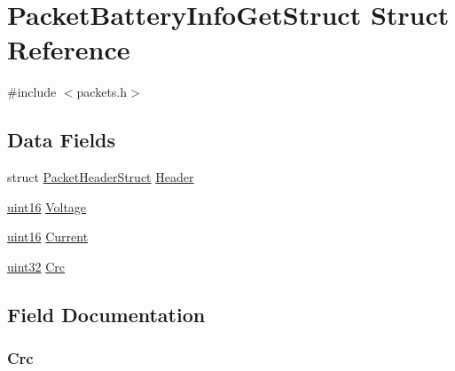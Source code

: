\hypertarget{struct_packet_battery_info_get_struct}{}\section{Packet\+Battery\+Info\+Get\+Struct Struct Reference}
\label{struct_packet_battery_info_get_struct}


{\ttfamily \#include $<$packets.\+h$>$}

\subsection*{Data Fields}
\begin{DoxyCompactItemize}
\item 
struct \hyperlink{struct_packet_header_struct}{Packet\+Header\+Struct} \hyperlink{struct_packet_battery_info_get_struct_ab201af50281aff5ed4f984f994938007}{Header}
\item 
\hyperlink{_h_y_d_r_a_s_8_x_2types_8h_ac2a9e79eb120216f855626495b7bd18a}{uint16} \hyperlink{struct_packet_battery_info_get_struct_a34cd5c2ca0ba84ff82687399f173dcee}{Voltage}
\item 
\hyperlink{_h_y_d_r_a_s_8_x_2types_8h_ac2a9e79eb120216f855626495b7bd18a}{uint16} \hyperlink{struct_packet_battery_info_get_struct_ace27e048112fedacb5b3b2e1842476d5}{Current}
\item 
\hyperlink{_h_y_d_r_a_s_8_x_2types_8h_acbd4acd0d29e2d6c43104827f77d9cd2}{uint32} \hyperlink{struct_packet_battery_info_get_struct_a1aaa4998291cff4c19ca5cca4b1e9489}{Crc}
\end{DoxyCompactItemize}


\subsection{Field Documentation}
\hypertarget{struct_packet_battery_info_get_struct_a1aaa4998291cff4c19ca5cca4b1e9489}{}
\subsubsection[{Crc}]{ Crc}\label{struct_packet_battery_info_get_struct_a1aaa4998291cff4c19ca5cca4b1e9489}
\hypertarget{struct_packet_battery_info_get_struct_ace27e048112fedacb5b3b2e1842476d5}{}
